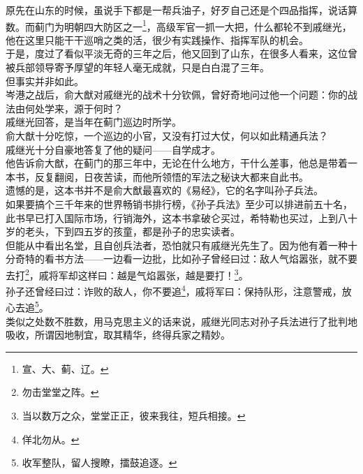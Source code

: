 \begin{multicols}{\theparacolNo}
原先在山东的时候，虽说手下都是一帮兵油子，好歹自己还是个四品指挥，说话算数。而蓟门为明朝四大防区之一\footnote{宣、大、蓟、辽。}，高级军官一抓一大把，什么都轮不到戚继光，他在这里只能干干巡哨之类的活，很少有实践操作、指挥军队的机会。\\

于是，度过了看似平淡无奇的三年之后，他又回到了山东，在很多人看来，这位曾被兵部领导寄予厚望的年轻人毫无成就，只是白白混了三年。\\

但事实并非如此。\\

岑港之战后，俞大猷对戚继光的战术十分钦佩，曾好奇地问过他一个问题：你的战法由何处学来，源于何时？\\

戚继光回答，是当年在蓟门巡边时所学。\\

俞大猷十分吃惊，一个巡边的小官，又没有打过大仗，何以如此精通兵法？\\

戚继光十分自豪地答复了他的疑问——自学成才。\\

他告诉俞大猷，在蓟门的那三年中，无论在什么地方，干什么差事，他总是带着一本书，反复翻阅，日夜苦读，而他所领悟的军法之秘诀大都来自此书。\\

遗憾的是，这本书并不是俞大猷最喜欢的《易经》，它的名字叫孙子兵法。\\

如果要搞个三千年来的世界畅销书排行榜，《孙子兵法》至少可以排进前五十名，此书早已打入国际市场，行销海外，这本书拿破仑买过，希特勒也买过，上到八十岁的老头，下到四五岁的孩童，都是孙子的忠实读者。\\

但能从中看出名堂，且自创兵法者，恐怕就只有戚继光先生了。因为他有着一种十分奇特的看书方法——一边看一边批，比如孙子曾经曰过：敌人气焰嚣张，就不要去打\footnote{勿击堂堂之阵。}，戚将军却这样曰：越是气焰嚣张，越是要打！\footnote{当以数万之众，堂堂正正，彼来我往，短兵相接。}。\\

孙子还曾经曰过：诈败的敌人，你不要追\footnote{佯北勿从。}，戚将军曰：保持队形，注意警戒，放心去追\footnote{收军整队，留人搜瞭，擂鼓追逐。}。\\

类似之处数不胜数，用马克思主义的话来说，戚继光同志对孙子兵法进行了批判地吸收，所谓因地制宜，取其精华，终得兵家之精妙。\\


\end{multicols}
